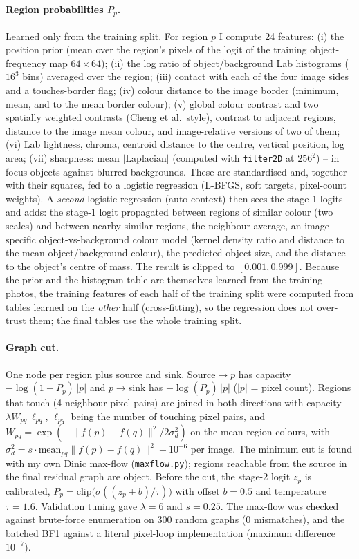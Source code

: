 \documentclass[11pt,a4paper]{article}
\begin{document}
\paragraph{Region probabilities $P_p$.} Learned only from the training split. For region $p$ I compute 24 features:
(i) the position prior (mean over the region's pixels of the logit of the training object-frequency map $64{\times}64$);
(ii) the log ratio of object/background Lab histograms ($16^3$ bins) averaged over the region;
(iii) contact with each of the four image sides and a touches-border flag;
(iv) colour distance to the image border (minimum, mean, and to the mean border colour);
(v) global colour contrast and two spatially weighted contrasts (Cheng et al.\ style), contrast to adjacent regions, distance to the image mean colour, and
image-relative versions of two of them;
(vi) Lab lightness, chroma, centroid distance to the centre, vertical position, log area;
(vii) sharpness: mean $|\text{Laplacian}|$ (computed with \texttt{filter2D} at $256^2$) -- in focus objects against blurred backgrounds.
These are standardised and, together with their squares, fed to a logistic regression (L-BFGS, soft targets, pixel-count weights).
A \emph{second} logistic regression (auto-context) then sees the stage-1 logits and adds: the stage-1 logit propagated between regions of similar colour (two scales) and between
nearby similar regions, the neighbour average, an image-specific object-vs-background colour model (kernel density ratio and distance to the mean object/background colour),
the predicted object size, and the distance to the object's centre of mass. The result is clipped to $[0.001,0.999]$.
Because the prior and the histogram table are themselves learned from the training photos, the training features of each half of the training split were computed from tables learned on the
\emph{other} half (cross-fitting), so the regression does not over-trust them; the final tables use the whole training split.

\paragraph{Graph cut.} One node per region plus source and sink. Source$\to p$ has capacity $-\log(1-P_p)\,|p|$ and $p\to$sink has $-\log(P_p)\,|p|$ ($|p|$ = pixel count).
Regions that touch (4-neighbour pixel pairs) are joined in both directions with capacity $\lambda W_{pq}\,\ell_{pq}$, $\ell_{pq}$ being the number of touching pixel pairs, and
$W_{pq}=\exp(-\|f(p)-f(q)\|^2/2\sigma_d^2)$ on the mean region colours, with $\sigma_d^2=s\cdot\mathrm{mean}_{pq}\|f(p)-f(q)\|^2+10^{-6}$ per image.
The minimum cut is found with my own Dinic max-flow (\texttt{maxflow.py}); regions reachable from the source in the final residual graph are object.
Before the cut, the stage-2 logit $z_p$ is calibrated, $P_p=\mathrm{clip}\big(\sigma((z_p+b)/\tau)\big)$ with offset $b=0.5$ and temperature $\tau=1.6$. Validation tuning gave $\lambda=6$ and $s=0.25$. The max-flow was checked against brute-force enumeration on 300 random graphs (0 mismatches), and the batched BF1 against a literal pixel-loop implementation
(maximum difference $10^{-7}$).
\end{document}
